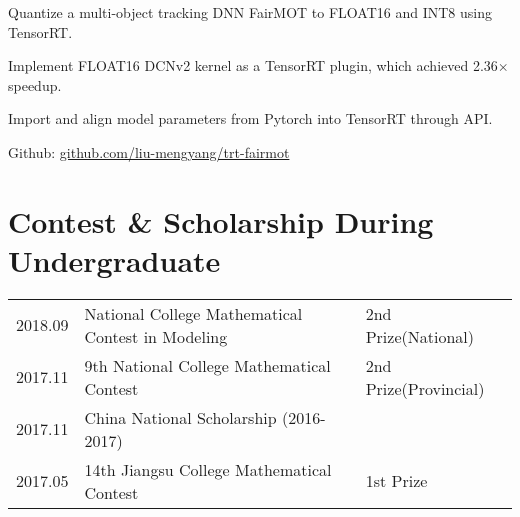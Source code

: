 \documentclass[]{deedy-resume-openfont}
\begin{document}
\begin{minipage}[t]{0.77\textwidth}
\begin{tightemize}
    \item Quantize a multi-object tracking DNN FairMOT to FLOAT16 and INT8 using TensorRT.
    \item Implement FLOAT16 DCNv2 kernel as a TensorRT plugin, which achieved 2.36$\times$ speedup.
    \item Import and align model parameters from Pytorch into TensorRT through API.
    \item Github: \href{https://github.com/liu-mengyang/trt-fairmot}{github.com/liu-mengyang/trt-fairmot}
\end{tightemize}
\sectionsep

\section{Contest \& Scholarship During Undergraduate} 
\begin{tabular}{lll}
    2018.09 & National College Mathematical Contest in Modeling & 2nd Prize(National) \\
    2017.11 & 9th National College Mathematical Contest & 2nd Prize(Provincial) \\
    2017.11 & China National Scholarship (2016-2017) & \\
    2017.05 & 14th Jiangsu College Mathematical Contest & 1st Prize\\
\end{tabular}
\sectionsep

\end{minipage} 
\end{document}
